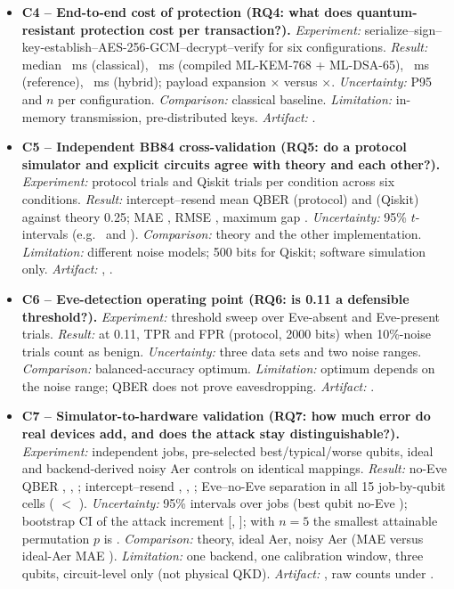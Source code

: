 \begin{itemize}
\item \textbf{C4 -- End-to-end cost of protection (RQ4: what does quantum-resistant protection cost per transaction?).} \emph{Experiment:} serialize--sign--key-establish--AES-256-GCM--decrypt--verify for six configurations. \emph{Result:} median \EEAMedian{}~ms (classical), \EECMedian{}~ms (compiled ML-KEM-768 + ML-DSA-65), \EEBMedian{}~ms (reference), \EEDMedian{}~ms (hybrid); payload expansion \EEAExpansion{}$\times$ versus \EECExpansion{}$\times$. \emph{Uncertainty:} P95 and $n$ per configuration. \emph{Comparison:} classical baseline. \emph{Limitation:} in-memory transmission, pre-distributed keys. \emph{Artifact:} .
\item \textbf{C5 -- Independent BB84 cross-validation (RQ5: do a protocol simulator and explicit circuits agree with theory and each other?).} \emph{Experiment:} \ProtoTrials{} protocol trials and \QiskTrials{} Qiskit trials per condition across six conditions. \emph{Result:} intercept--resend mean QBER \BbqProtoKEve{} (protocol) and \BbqQiskEve{} (Qiskit) against theory 0.25; MAE \BbMAE{}, RMSE \BbRMSE{}, maximum gap \BbMaxDiff{}. \emph{Uncertainty:} 95\% $t$-intervals (e.g.\ \BbciProtoKEve{} and \BbciQiskEve{}). \emph{Comparison:} theory and the other implementation. \emph{Limitation:} different noise models; 500 bits for Qiskit; software simulation only. \emph{Artifact:} , .
\item \textbf{C6 -- Eve-detection operating point (RQ6: is 0.11 a defensible threshold?).} \emph{Experiment:} threshold sweep over Eve-absent and Eve-present trials. \emph{Result:} at 0.11, TPR \ThrTPRProtoK{} and FPR \ThrFPRProtoK{} (protocol, 2000 bits) when 10\%-noise trials count as benign. \emph{Uncertainty:} three data sets and two noise ranges. \emph{Comparison:} balanced-accuracy optimum. \emph{Limitation:} optimum depends on the noise range; QBER does not prove eavesdropping. \emph{Artifact:} .
\item \textbf{C7 -- Simulator-to-hardware validation (RQ7: how much error do real devices add, and does the attack stay distinguishable?).} \emph{Experiment:} \HwJobs{} independent \HwBackend{} jobs, pre-selected best/typical/worse qubits, ideal and backend-derived noisy Aer controls on identical mappings. \emph{Result:} no-Eve QBER \HwNoEveBest{}, \HwNoEveTypical{}, \HwNoEveWorse{}; intercept--resend \HwEveBest{}, \HwEveTypical{}, \HwEveWorse{}; Eve--no-Eve separation in all 15 job-by-qubit cells (\HwMaxNoEve{} $<$ \HwMinEve{}). \emph{Uncertainty:} 95\% intervals over jobs (best qubit no-Eve \HwNoEveCIBest{}); bootstrap CI of the attack increment [\HwDeltaBootLoBest{}, \HwDeltaBootHiBest{}]; with $n=5$ the smallest attainable permutation $p$ is \HwPermBest{}. \emph{Comparison:} theory, ideal Aer, noisy Aer (MAE \HwNoisyMAE{} versus ideal-Aer MAE \HwIdealMAE{}). \emph{Limitation:} one backend, one calibration window, three qubits, circuit-level only (not physical QKD). \emph{Artifact:} , raw counts under .

\end{itemize}
